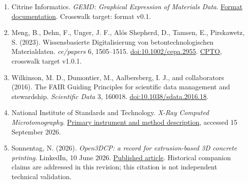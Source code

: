 \documentclass[
  american,
  11pt,
  letterpaper,
]{article}
\begin{document}
\begin{enumerate}
\item
  Citrine Informatics. \emph{GEMD: Graphical Expression of Materials
  Data}. \href{https://citrineinformatics.github.io/gemd-docs/}{Format
  documentation}. Crosswalk target: format v0.1.
\item
  Meng, B., Dehn, F., Unger, J. F., Alós Shepherd, D., Tamsen, E.,
  Pirskawetz, S. (2023). Wissensbasierte Digitalisierung von
  betontechnologischen Materialdaten. \emph{ce/papers} 6, 1505--1515.
  \href{https://doi.org/10.1002/cepa.2955}{doi:10.1002/cepa.2955}.
  \href{https://w3id.org/cpto}{CPTO}, crosswalk target v1.0.1.
\item
  Wilkinson, M. D., Dumontier, M., Aalbersberg, I. J., and collaborators
  (2016). The FAIR Guiding Principles for scientific data management and
  stewardship. \emph{Scientific Data} 3, 160018.
  \href{https://doi.org/10.1038/sdata.2016.18}{doi:10.1038/sdata.2016.18}.
\item
  National Institute of Standards and Technology. \emph{X-Ray Computed
  Microtomography}.
  \href{https://www.nist.gov/programs-projects/x-ray-computed-microtomography}{Primary
  instrument and method description}, accessed 15 September 2026.
\item
  Sonnentag, N. (2026). \emph{Open3DCP: a record for extrusion-based 3D
  concrete printing}. LinkedIn, 10 June 2026.
  \href{https://www.linkedin.com/pulse/open3dcp-record-extrusion-based-3d-concrete-printing-nick-sonnentag-h66kc}{Published
  article}. Historical companion claims are addressed in this revision;
  this citation is not independent technical validation.
\end{enumerate}

\endgroup
\end{document}
